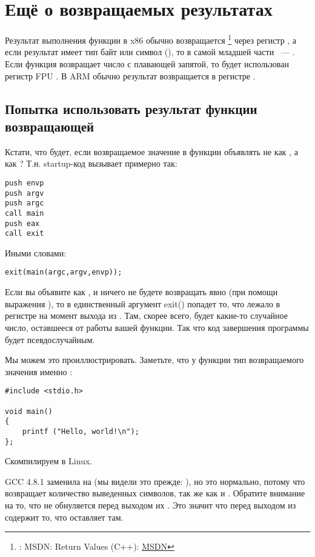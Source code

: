 \chapter{Ещё о возвращаемых результатах}

Результат выполнения функции в x86 обычно возвращается
\footnote{\Seealso: MSDN: Return Values (C++): \href{http://go.yurichev.com/17258}{MSDN}}
через регистр \EAX, а если результат имеет тип байт или символ (\Tchar), 
то в самой младшей части \EAX~--- \AL. Если функция возвращает число с плавающей запятой, 
то будет использован регистр FPU .
\ifdefined\IncludeARM
{}
В ARM обычно результат возвращается в регистре .
\fi

\section{Попытка использовать результат функции возвращающей \Tvoid}

Кстати, что будет, если возвращаемое значение в функции \main объявлять не как \Tint, а как \Tvoid?
Т.н. startup-код вызывает \main примерно так:

\begin{lstlisting}
push envp
push argv
push argc
call main
push eax
call exit
\end{lstlisting}

Иными словами:

\begin{lstlisting}
exit(main(argc,argv,envp));
\end{lstlisting}

Если вы объявите \main как \Tvoid, и ничего не будете возвращать явно (при помощи выражения ), то в единственный аргумент exit() попадет то, что лежало в регистре \EAX на момент выхода из \main.
Там, скорее всего, будет какие-то случайное число, оставшееся от работы вашей функции. Так что код завершения программы будет псевдослучайным.

Мы можем это проиллюстрировать.
Заметьте, что у функции \main тип возвращаемого значения именно \Tvoid{}:

\begin{lstlisting}
#include <stdio.h>

void main()
{
	printf ("Hello, world!\n");
};
\end{lstlisting}

Скомпилируем в Linux.

GCC 4.8.1 заменила \printf на \puts 
(мы видели это прежде: ), но это нормально, потому что \puts возвращает количество
выведенных символов, так же как и \printf.
Обратите внимание на то, что \EAX не обнуляется перед выходом их \main.
Это значит что \EAX перед выходом из \main содержит то, что \puts оставляет там.


